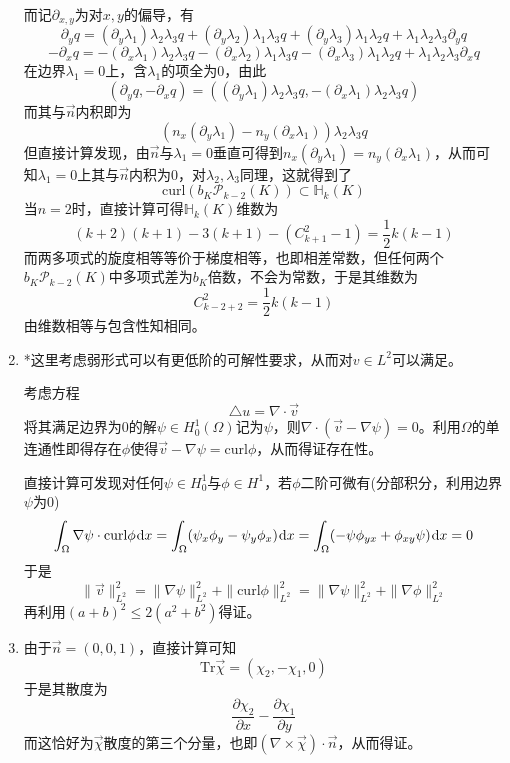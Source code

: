 \documentclass[a4paper,UTF8,fontset=windows,10pt]{ctexart}
\newcommand*{\dr}{\hspace{0.07em}\mathrm{d}}
\begin{document}
\begin{enumerate}
    而记$\partial_{x,y}$为对$x,y$的偏导，有
    $$\partial_yq=(\partial_y\lambda_1)\lambda_2\lambda_3q+(\partial_y\lambda_2)\lambda_1\lambda_3q+(\partial_y\lambda_3)\lambda_1\lambda_2q+\lambda_1\lambda_2\lambda_3\partial_yq$$
    $$-\partial_xq=-(\partial_x\lambda_1)\lambda_2\lambda_3q-(\partial_x\lambda_2)\lambda_1\lambda_3q-(\partial_x\lambda_3)\lambda_1\lambda_2q+\lambda_1\lambda_2\lambda_3\partial_xq$$
    在边界$\lambda_1=0$上，含$\lambda_1$的项全为0，由此
    $$(\partial_yq,-\partial_xq)=((\partial_y\lambda_1)\lambda_2\lambda_3q,-(\partial_x\lambda_1)\lambda_2\lambda_3q)$$
    而其与$\vec{n}$内积即为
    $$(n_x(\partial_y\lambda_1)-n_y(\partial_x\lambda_1))\lambda_2\lambda_3q$$
    但直接计算发现，由$\vec{n}$与$\lambda_1=0$垂直可得到$n_x(\partial_y\lambda_1)=n_y(\partial_x\lambda_1)$，从而可知$\lambda_1=0$上其与$\vec{n}$内积为0，对$\lambda_2,\lambda_3$同理，这就得到了
    $$\mathrm{curl}(b_K\mathcal{P}_{k-2}(K))\subset\mathbb{H}_k(K)$$
    当$n=2$时，直接计算可得$\mathbb{H}_k(K)$维数为
    $$(k+2)(k+1)-3(k+1)-(C_{k+1}^2-1)=\frac{1}{2}k(k-1)$$
    而两多项式的旋度相等等价于梯度相等，也即相差常数，但任何两个$b_K\mathcal{P}_{k-2}(K)$中多项式差为$b_K$倍数，不会为常数，于是其维数为
    $$C_{k-2+2}^2=\frac{1}{2}k(k-1)$$
    由维数相等与包含性知相同。

    \item *这里考虑弱形式可以有更低阶的可解性要求，从而对$v\in L^2$可以满足。
    
    考虑方程
    $$\triangle u=\nabla\cdot\vec{v}$$
    将其满足边界为0的解$\psi\in H_0^1(\Omega)$记为$\psi$，则$\nabla\cdot(\vec{v}-\nabla\psi)=0$。利用$\Omega$的单连通性即得存在$\phi$使得$\vec{v}-\nabla\psi=\mathrm{curl}\phi$，从而得证存在性。

    直接计算可发现对任何$\psi\in H_0^1$与$\phi\in H^1$，若$\phi$二阶可微有(分部积分，利用边界$\psi$为0)
    $$\int_\Omega\nabla\psi\cdot\mathrm{curl}\phi\dr x=\int_\Omega(\psi_x\phi_y-\psi_y\phi_x)\dr x=\int_\Omega(-\psi\phi_{yx}+\phi_{xy}\psi)\dr x=0$$
    于是
    $$\|\vec{v}\|_{L^2}^2=\|\nabla\psi\|_{L^2}^2+\|\mathrm{curl}\phi\|_{L^2}^2=\|\nabla\psi\|_{L^2}^2+\|\nabla\phi\|_{L^2}^2$$
    再利用$(a+b)^2\le 2(a^2+b^2)$得证。

    \item
    由于$\vec{n}=(0,0,1)$，直接计算可知
    $$\mathrm{Tr}\vec{\chi}=(\chi_2,-\chi_1,0)$$
    于是其散度为
    $$\frac{\partial\chi_2}{\partial x}-\frac{\partial\chi_1}{\partial y}$$
    而这恰好为$\vec{\chi}$散度的第三个分量，也即$(\nabla\times\vec\chi)\cdot\vec{n}$，从而得证。


\end{enumerate}
\end{document}
